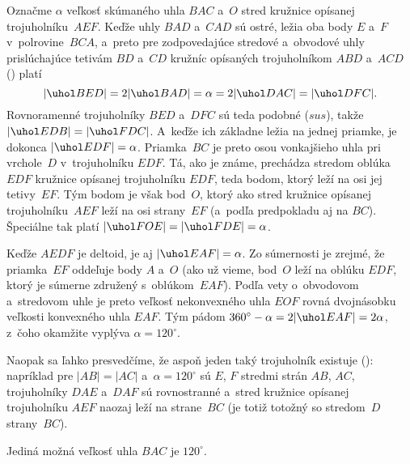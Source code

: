{%
Označme $\alpha$ veľkosť skúmaného uhla $BAC$ a~$O$
stred kružnice opísanej trojuholníku~$AEF$.
Keďže uhly $BAD$ a~$CAD$ sú ostré, ležia oba body $E$ a~$F$
v~polrovine~$BCA$, a~preto
pre zodpovedajúce stredové a~obvodové uhly prislúchajúce tetivám $BD$ a~$CD$
kružníc opísaných trojuholníkom $ABD$ a~$ACD$ (\obr) platí
$$
|\uhol BED|=2 |\uhol BAD|=\alpha=2 |\uhol DAC|=|\uhol DFC|.
$$
Rovnoramenné trojuholníky $BED$ a~$DFC$ sú teda podobné ($sus$), takže
$|\uhol EDB|=|\uhol FDC|$. A~keďže ich základne ležia na jednej priamke,
je dokonca $|\uhol EDF|=\alpha$.
Priamka~$BC$ je preto osou vonkajšieho uhla pri vrchole~$D$
v~trojuholníku $EDF$. Tá, ako je známe, prechádza stredom oblúka~$EDF$ kružnice opísanej
trojuholníku $EDF$, teda bodom, ktorý leží na osi jej tetivy~$EF$. Tým bodom
je však bod~$O$, ktorý ako stred kružnice opísanej trojuholníku~$AEF$ leží
na osi strany~$EF$ (a~podľa predpokladu aj na $BC$).
Špeciálne tak platí $|\uhol FOE|=|\uhol FDE|=\alpha$.
%

Keďže $AEDF$ je deltoid, je aj $|\uhol EAF|=\alpha$.
Zo súmernosti je zrejmé, že priamka~$EF$ oddeľuje body $A$ a~$O$
(ako už vieme, bod~$O$ leží na oblúku $EDF$, ktorý je súmerne združený
s~oblúkom~$EAF$).
Podľa vety
o~obvodovom a~stredovom uhle je preto veľkosť nekonvexného uhla $EOF$
rovná dvojnásobku veľkosti konvexného uhla $EAF$. Tým pádom
$360^\circ-\alpha =2 |\uhol EAF|=2 \alpha$, z~čoho okamžite
vyplýva $\alpha=120^\circ$.

Naopak sa ľahko presvedčíme, že aspoň jeden taký trojuholník existuje (\obr):
napríklad pre $|AB|=|AC|$ a~$\alpha=120^\circ$ sú $E$, $F$ stredmi strán $AB$, $AC$,
trojuholníky $DAE$ a~$DAF$ sú rovnostranné a~stred kružnice opísanej
trojuholníku $AEF$ naozaj leží na strane~$BC$ (je totiž totožný so
stredom~$D$ strany~$BC$).
%

\odpoved
Jediná možná veľkosť uhla $BAC$ je $120^\circ$.
}

